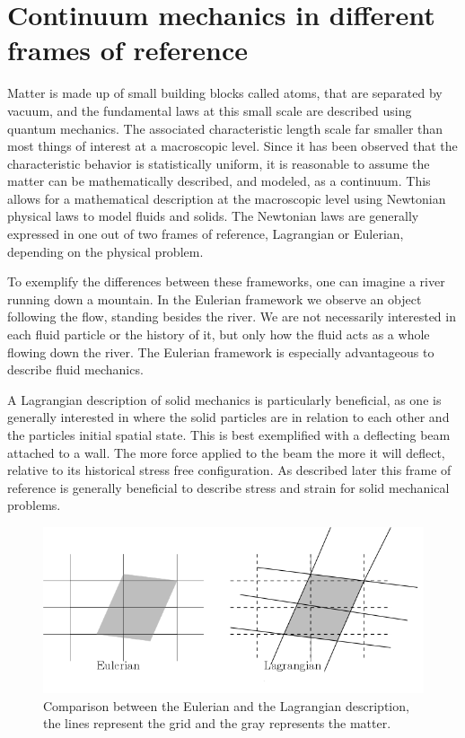 \chapter{Continuum mechanics in different frames of reference}
Matter is made up of small building blocks called atoms, that are separated by vacuum, and the fundamental laws at this small scale are described using quantum mechanics. The associated characteristic length scale far smaller than most things of interest at a macroscopic level. Since it has been observed that the characteristic behavior is statistically uniform, it is reasonable to assume the matter can be mathematically described, and modeled, as a continuum. This allows for a mathematical description at the macroscopic level using Newtonian physical laws to model fluids and solids. The Newtonian laws are generally expressed in one out of two frames of reference, Lagrangian or Eulerian, depending on the physical problem. \newline

To exemplify the differences between these frameworks, one can imagine a river running down a mountain.	
In the Eulerian framework we observe an object following the flow, standing besides the river. We are not necessarily interested in each fluid particle or the history of it, but only how the fluid acts as a whole flowing down the river. The Eulerian framework is especially advantageous to describe fluid mechanics.\newline

A Lagrangian description of solid mechanics is particularly beneficial, as one is generally interested in where the solid particles are in relation to each other and the particles initial spatial state.  
This is best exemplified with a deflecting beam attached to a wall. The more force applied to the beam the more it will deflect, relative to its historical stress free configuration. As described later this frame of reference is generally beneficial to describe stress and strain for solid mechanical problems.\newline

\begin{figure}[H]
\label{pic:E_L}
\includegraphics[scale=0.50]{./Continuum_mechanics/E_L.png}
\caption{Comparison between the Eulerian and the Lagrangian description, the lines represent the grid and the gray represents the matter.}
\end{figure}

